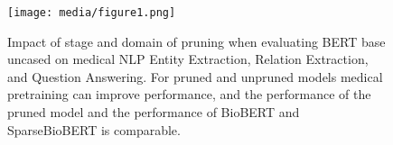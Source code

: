 \documentclass[10pt]{article}
\begin{document}
\begin{figure}[!
t]
    \centering
    \texttt{[image: media/figure1.png]}
    \vspace{-1.2em}
    \begin{comment}
\begin{tikzpicture}
 \scalebox{0.5}{ 
    \begin{axis}[
        width  = .9*\textwidth,
        height = 8cm,
        major x tick style = transparent,
        ybar=2*\pgflinewidth,
        bar width=14pt,
        ymajorgrids = true,
        ylabel = {Task Metric},
        symbolic x coords={Overall,Entity,Relation,Question Answering},
        xtick = data,
        scaled y ticks = false,
        enlarge x limits=0.15,
        ymin=60,
        legend cell align=left,
        legend style={
                at={(1,1.05)},
                anchor=south east,
                column sep=2ex
        }
    ]
        \addplot[style={bblue,fill=bblue,mark=none}]
            coordinates {(Overall,77.76) (Entity, 84.45) (Relation,86.86) (Question Answering,61.97)};
        \addplot[style={brown,fill=brown,mark=none}]
            coordinates {(Overall,80.62) (Entity, 85.96) (Relation,87.56) (Question Answering,68.33)};
        \addplot[style={rred,fill=rred,mark=none}]
            coordinates {(Overall, 75.28)(Entity, 76.12) (Relation,84.36) (Question Answering,65.39)};

        \addplot[style={ggreen,fill=ggreen,mark=none}]
             coordinates {(Overall,78.27) (Entity,80.84) (Relation,85.54) (Question Answering,68.44)};

        \addplot[style={ppurple,fill=ppurple,mark=none}]
             coordinates {(Overall,80.42) (Entity,86.36) (Relation,88.57) (Question Answering,66.33)};
        \addplot[style={oorange,fill=oorange
        ,mark=none}]
             coordinates {(Overall,78.27) (Entity,82.50) (Relation,86.60) (Question Answering,65.71)};
        \legend{No Pruning(BERT), No Pruning + Medical Pretraining (BioBERT), Finetuning Pruning, General Pretraining Pruning (Sparse*BERT), General Pretraining Pruning + Medical Pretraining (SparseBioBERT), Medical Pretraining Pruning}
    \end{axis}}
\end{tikzpicture}
\end{comment}
\caption{Impact of stage and domain of pruning when evaluating BERT base uncased on medical NLP Entity Extraction, Relation Extraction, and Question Answering. For pruned and unpruned models medical pretraining can improve performance, and the performance of the pruned model and the performance of BioBERT and SparseBioBERT is comparable.}
\label{fig:sparse_transfer_categorical}
\end{figure}
\end{document}
